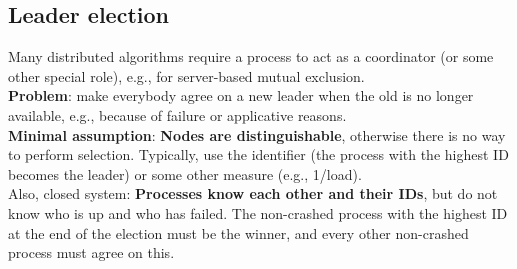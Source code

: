 \documentclass[10pt,a4paper]{article}
\begin{document}
\subsection{Leader election}
Many distributed algorithms require a process to act as a coordinator (or some other special role), e.g., for server-based mutual exclusion. \\
\textbf{Problem}: make everybody agree on a new leader when the old is no longer available, e.g., because of failure or applicative reasons. \\
\textbf{Minimal assumption}: \textbf{Nodes are distinguishable}, otherwise there is no way to perform selection. Typically, use the identifier (the process with the highest ID becomes the leader) or some other measure (e.g., 1/load). \\
Also, closed system: \textbf{Processes know each other and their IDs}, but do not know who is up and who has failed. The non-crashed process with the highest ID at the end of the election must be the winner, and every other non-crashed process must agree on this. 
\end{document}

